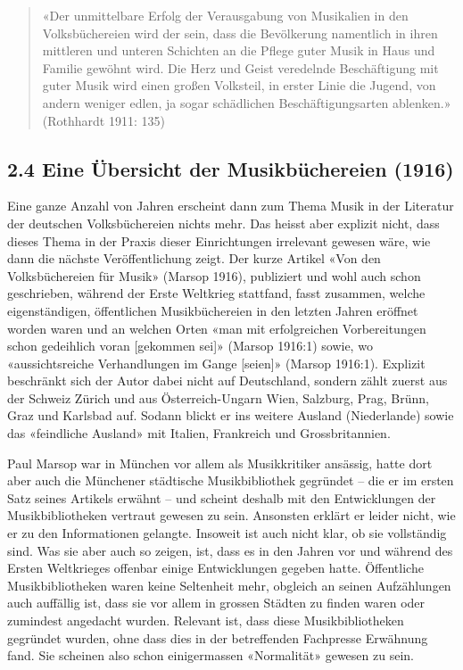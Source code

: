 \documentclass[a4paper,
fontsize=11pt,
oneside,
numbers=noperiodatend,
parskip=half-,
bibliography=totoc,
final
]{scrartcl}
\begin{document}
\begin{quote}
«Der unmittelbare Erfolg der Verausgabung von Musikalien in den
Volksbüchereien wird der sein, dass die Bevölkerung namentlich in ihren
mittleren und unteren Schichten an die Pflege guter Musik in Haus und
Familie gewöhnt wird. Die Herz und Geist veredelnde Beschäftigung mit
guter Musik wird einen großen Volksteil, in erster Linie die Jugend, von
andern weniger edlen, ja sogar schädlichen Beschäftigungsarten
ablenken.» (Rothhardt 1911: 135)
\end{quote}

\hypertarget{eine-uxfcbersicht-der-musikbuxfcchereien-1916}{%
\subsection{2.4 Eine Übersicht der Musikbüchereien
(1916)}\label{eine-uxfcbersicht-der-musikbuxfcchereien-1916}}

Eine ganze Anzahl von Jahren erscheint dann zum Thema Musik in der
Literatur der deutschen Volksbüchereien nichts mehr. Das heisst aber
explizit nicht, dass dieses Thema in der Praxis dieser Einrichtungen
irrelevant gewesen wäre, wie dann die nächste Veröffentlichung zeigt.
Der kurze Artikel «Von den Volksbüchereien für Musik» (Marsop 1916),
publiziert und wohl auch schon geschrieben, während der Erste Weltkrieg
stattfand, fasst zusammen, welche eigenständigen, öffentlichen
Musikbüchereien in den letzten Jahren eröffnet worden waren und an
welchen Orten «man mit erfolgreichen Vorbereitungen schon gedeihlich
voran {[}gekommen sei{]}» (Marsop 1916:1) sowie, wo «aussichtsreiche
Verhandlungen im Gange {[}seien{]}» (Marsop 1916:1). Explizit beschränkt
sich der Autor dabei nicht auf Deutschland, sondern zählt zuerst aus der
Schweiz Zürich und aus Österreich-Ungarn Wien, Salzburg, Prag, Brünn,
Graz und Karlsbad auf. Sodann blickt er ins weitere Ausland
(Niederlande) sowie das «feindliche Ausland» mit Italien, Frankreich und
Grossbritannien.

Paul Marsop war in München vor allem als Musikkritiker ansässig, hatte
dort aber auch die Münchener städtische Musikbibliothek gegründet -- die
er im ersten Satz seines Artikels erwähnt -- und scheint deshalb mit den
Entwicklungen der Musikbibliotheken vertraut gewesen zu sein. Ansonsten
erklärt er leider nicht, wie er zu den Informationen gelangte. Insoweit
ist auch nicht klar, ob sie vollständig sind. Was sie aber auch so
zeigen, ist, dass es in den Jahren vor und während des Ersten
Weltkrieges offenbar einige Entwicklungen gegeben hatte. Öffentliche
Musikbibliotheken waren keine Seltenheit mehr, obgleich an seinen
Aufzählungen auch auffällig ist, dass sie vor allem in grossen Städten
zu finden waren oder zumindest angedacht wurden. Relevant ist, dass
diese Musikbibliotheken gegründet wurden, ohne dass dies in der
betreffenden Fachpresse Erwähnung fand. Sie scheinen also schon
einigermassen «Normalität» gewesen zu sein.
\end{document}
